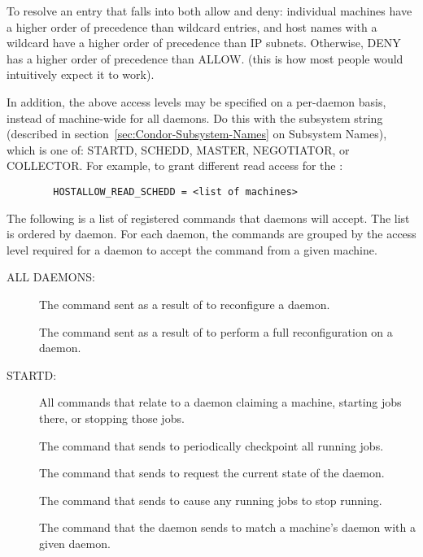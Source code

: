 To resolve an entry that falls into both allow and deny:
individual
machines have a higher order of precedence than wildcard entries, and
host names with a wildcard have a higher order of precedence than IP
subnets.
Otherwise, DENY has a higher order of precedence than ALLOW.
(this is how most people would intuitively expect it to work).  

In addition, the above access levels may be specified on a
per-daemon basis, instead of machine-wide for all daemons.
Do this with the subsystem string (described in
section~\ref{sec:Condor-Subsystem-Names} on Subsystem Names),
which is one of: STARTD, SCHEDD, MASTER, NEGOTIATOR,
or COLLECTOR.
For example, to grant different read access for the :
\begin{verbatim}
        HOSTALLOW_READ_SCHEDD = <list of machines>
\end{verbatim}

The following is a list of registered commands that daemons will
accept.  The list is ordered by daemon.
For each daemon, the commands are grouped by the access level
required for a daemon to accept the command from a
given machine.

ALL DAEMONS:

\begin{description}
\item[]

  The command sent as a result of  to reconfigure a daemon.

\item[]

  The command sent as a result of 
  to perform a full reconfiguration on a daemon. 
\end{description}

STARTD:

\begin{description}
\item[] 

All commands that relate to a  daemon claiming
  a machine, starting jobs there, or stopping those jobs.

The command that  sends to periodically checkpoint
  all running jobs.

\item[]

The command that  sends to request the
  current state of the  daemon.

\item[]
The command that  sends to cause
  any running jobs to stop running.

\item[]
The command that the  daemon sends to
  match a machine's  daemon with a given 
  daemon.
\end{description}

